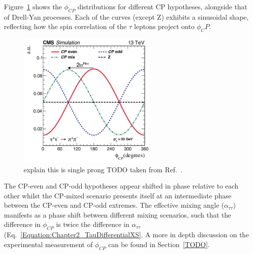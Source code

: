 Figure~\ref{Figure:Chapter2_PhiCP_Gen} shows the $\phi_{CP}$ distributions for different CP hypotheses, alongside that of Drell-Yan processes. Each of the curves (except Z) exhibits a sinusoidal shape, reflecting how the spin correlation of the $\tau$ leptons project onto $\phi_CP$. 

\begin{figure}[h]
\centering
\includegraphics[width= 0.6\textwidth]{Figures/Chapter2/CP_Scenarios_MixingAngle.png}
\caption{explain this is single prong TODO taken from Ref.~\cite{HiggsCP_CMS_2021}.}
\label{Figure:Chapter2_PhiCP_Gen}
\end{figure}

The CP-even and CP-odd hypotheses appear shifted in phase relative to each other whilst the CP-mixed scenario presents itself at an intermediate phase between the CP-even and CP-odd extremes. The effective mixing angle ($\alpha_{\tau\tau}$) manifests as a phase shift between different mixing scenarios, such that the difference in $\phi_{CP}$ is twice the difference in 
$\alpha_{\tau\tau}$ (Eq.~\ref{Equation:Chapter2_TauDifferentialXS}. A more in depth discussion on the experimental measurement of $\phi_{CP}$ can be found in Section~\ref{TODO}.